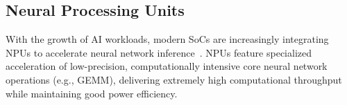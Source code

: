 






\subsection{Neural Processing Units}

With the growth of AI workloads, modern SoCs are increasingly integrating NPUs to accelerate neural network inference~\cite{hexagon,amd-xdna,intel-npu}. NPUs feature specialized acceleration of low-precision, computationally intensive core neural network operations (e.g., GEMM), delivering extremely high computational throughput while maintaining good power efficiency.

